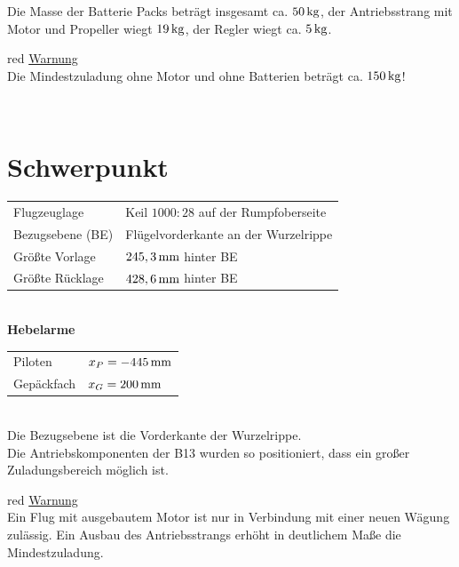\vspace{0.5cm}
Die Masse der Batterie Packs beträgt insgesamt ca. $\unit[50]{kg}$, der Antriebsstrang mit Motor und Propeller wiegt $\unit[19]{kg}$, der Regler wiegt ca. $\unit[5]{kg}$.\\

\begin{color}{red}
\large{\underline{Warnung}}\\
Die Mindestzuladung ohne Motor und ohne Batterien beträgt ca. $\unit[150]{kg}$!
\end{color}\\


\section{Schwerpunkt}
\begin{tabular}{l l}
Flugzeuglage & Keil $1000:28$ auf der Rumpfoberseite\\
Bezugsebene (BE) & Flügelvorderkante an der Wurzelrippe \\
Größte Vorlage & $\unit[245,3]{mm}$ hinter BE\\
Größte Rücklage & $\unit[428,6]{mm}$ hinter BE\\
\end{tabular}\\

\vspace{0.5cm}
\textbf{Hebelarme}\\
\begin{tabular}{m{} m{3cm}}
Piloten & $x_P=\unit[-445]{mm}$\\
Gepäckfach & $x_G=\unit[200]{mm}$\\
\end{tabular}\\

Die Bezugsebene ist die Vorderkante der Wurzelrippe.\\

Die Antriebskomponenten der B13 wurden so positioniert, dass ein großer Zuladungsbereich möglich ist. \\


\begin{color}{red}
\large{\underline{Warnung}}\\
Ein Flug mit ausgebautem Motor ist nur in Verbindung mit einer neuen Wägung zulässig. Ein Ausbau des Antriebsstrangs erhöht in deutlichem Maße die Mindestzuladung.
\end{color}\\


